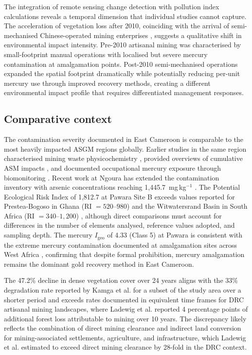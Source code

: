 \documentclass[preprint,12pt,number]{elsarticle}
\begin{document}
The integration of remote sensing change detection with pollution index calculations reveals a temporal dimension that individual studies cannot capture. The acceleration of vegetation loss after 2010, coinciding with the arrival of semi-mechanised Chinese-operated mining enterprises \cite{Weng2022}, suggests a qualitative shift in environmental impact intensity. Pre-2010 artisanal mining was characterised by small-footprint manual operations with localised but severe mercury contamination at amalgamation points. Post-2010 semi-mechanised operations expanded the spatial footprint dramatically while potentially reducing per-unit mercury use through improved recovery methods, creating a different environmental impact profile that requires differentiated management responses.

\subsection{Comparative context}

The contamination severity documented in East Cameroon is comparable to the most heavily impacted ASGM regions globally. Earlier studies in the same region characterised mining waste physicochemistry \cite{Mambou2020, Tehna2019}, provided overviews of cumulative ASM impacts \cite{Vishiti2023}, and documented occupational mercury exposure through biomonitoring \cite{Obase2018}. Recent work at Ngoura has extended the contamination inventory with arsenic concentrations reaching 1,445.7~mg\,kg$^{-1}$ \cite{Tchoukeu2026}. The Potential Ecological Risk Index of 1,812.7 at Pawara Site B exceeds values reported for Prestea-Bogoso in Ghana (RI $= 520$--$980$) \cite{Obiri2016} and the Witwatersrand Basin in South Africa (RI $= 340$--$1,200$) \cite{Kamunda2016}, although direct comparisons must account for differences in the number of elements analysed, reference values adopted, and sampling depth. The mercury $I_\text{geo}$ of 4.33 (Class 5) at Pawara is consistent with the extreme mercury contamination documented at amalgamation sites across West Africa \cite{Spiegel2005}, confirming that despite formal prohibition, mercury amalgamation remains the dominant gold recovery method in East Cameroon.

The 47.2\% decline in dense vegetation cover over 24 years aligns with the 33\% degradation rate reported by Kamga et al. \cite{Kamga2020} for a subset of the study area over a shorter period and exceeds rates documented in equivalent time frames for DRC artisanal mining landscapes, where Ladewig et al. \cite{Ladewig2024} reported 4 percentage points of additional forest loss attributable to mining over 10 years. The discrepancy likely reflects the combination of direct mining clearance and indirect land conversion for mining-associated settlements, agriculture, and infrastructure, which Ladewig et al. estimated to exceed direct mining clearance by 28-fold in the DRC context.
\end{document}
